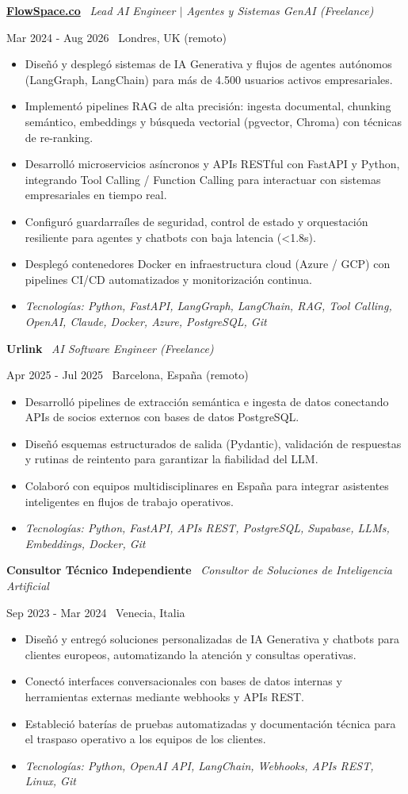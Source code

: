 \documentclass[a4paper,10pt]{article}
\newcommand{\role}[4]{%
  \vspace{2pt}\noindent
  \begin{minipage}[t]{0.70\textwidth}\raggedright\textbf{#1} \textbullet\ \textit{#3}\end{minipage}%
  \hfill
  \begin{minipage}[t]{0.28\textwidth}\raggedleft\footnotesize\color{gray}#2 \textbullet\ #4\end{minipage}%
  \vspace{1pt}%
}
\begin{document}
\role{\href{https://flowspace.co}{FlowSpace.co}}{Mar 2024 - Aug 2026}{Lead AI Engineer $\vert$ Agentes y Sistemas GenAI (Freelance)}{Londres, UK (remoto)}
\begin{itemize}
  \item Diseñó y desplegó sistemas de IA Generativa y flujos de agentes autónomos (LangGraph, LangChain) para más de 4.500 usuarios activos empresariales.
  \item Implementó pipelines RAG de alta precisión: ingesta documental, chunking semántico, embeddings y búsqueda vectorial (pgvector, Chroma) con técnicas de re-ranking.
  \item Desarrolló microservicios asíncronos y APIs RESTful con FastAPI y Python, integrando Tool Calling / Function Calling para interactuar con sistemas empresariales en tiempo real.
  \item Configuró guardarraíles de seguridad, control de estado y orquestación resiliente para agentes y chatbots con baja latencia (<1.8s).
  \item Desplegó contenedores Docker en infraestructura cloud (Azure / GCP) con pipelines CI/CD automatizados y monitorización continua.
  \item \textit{Tecnologías: Python, FastAPI, LangGraph, LangChain, RAG, Tool Calling, OpenAI, Claude, Docker, Azure, PostgreSQL, Git}
\end{itemize}

\role{Urlink}{Apr 2025 - Jul 2025}{AI Software Engineer (Freelance)}{Barcelona, España (remoto)}
\begin{itemize}
  \item Desarrolló pipelines de extracción semántica e ingesta de datos conectando APIs de socios externos con bases de datos PostgreSQL.
  \item Diseñó esquemas estructurados de salida (Pydantic), validación de respuestas y rutinas de reintento para garantizar la fiabilidad del LLM.
  \item Colaboró con equipos multidisciplinares en España para integrar asistentes inteligentes en flujos de trabajo operativos.
  \item \textit{Tecnologías: Python, FastAPI, APIs REST, PostgreSQL, Supabase, LLMs, Embeddings, Docker, Git}
\end{itemize}

\role{Consultor Técnico Independiente}{Sep 2023 - Mar 2024}{Consultor de Soluciones de Inteligencia Artificial}{Venecia, Italia}
\begin{itemize}
  \item Diseñó y entregó soluciones personalizadas de IA Generativa y chatbots para clientes europeos, automatizando la atención y consultas operativas.
  \item Conectó interfaces conversacionales con bases de datos internas y herramientas externas mediante webhooks y APIs REST.
  \item Estableció baterías de pruebas automatizadas y documentación técnica para el traspaso operativo a los equipos de los clientes.
  \item \textit{Tecnologías: Python, OpenAI API, LangChain, Webhooks, APIs REST, Linux, Git}
\end{itemize}
\end{document}
